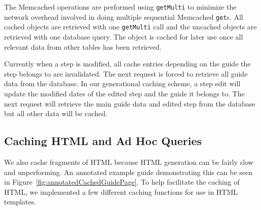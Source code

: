 \documentclass[12pt]{ucthesis}
\begin{document}
The \textsf{Memcached} operations are performed using {\tt getMulti} to minimize the network overhead involved in doing multiple sequential \textsf{Memcached} {\tt get}s.
All cached objects are retrieved with one {\tt getMulti} call and the uncached objects are retrieved with one database query.
The object is cached for later use once all relevant data from other tables has been retrieved.

Currently when a step is modified, all cache entries depending on the guide the step belongs to are invalidated.
The next request is forced to retrieve all guide data from the database.
In our generational caching scheme, a step edit will update the modified dates of the edited step and the guide it belongs to.
The next request will retrieve the main guide data and edited step from the database but all other data will be cached.

\subsection{Caching HTML and Ad Hoc Queries}
We also cache fragments of HTML because HTML generation can be fairly slow and unperforming.
An annotated example guide demonstrating this can be seen in Figure~\ref{fig:annotatedCachedGuidePage}.
To help facilitate the caching of HTML, we implemented a few different caching functions for use in HTML templates.
\end{document}
